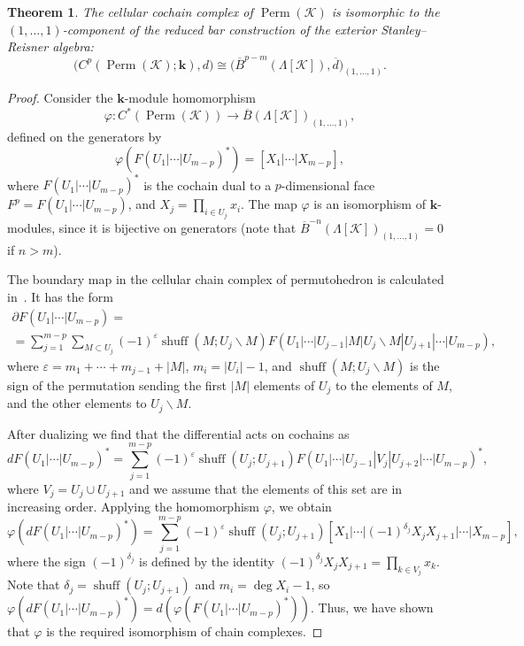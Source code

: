\documentclass[a4paper,12pt]{amsart}
\newcommand{\K}{\mathcal K}
\newcommand{\kk}{\mathbf{k}}
\newtheorem{theorem}[formula]{Theorem}
\theoremstyle{definition}
\theoremstyle{remark}
\numberwithin{equation}{section}
\DeclareMathOperator{\Perm}{Perm}
\begin{document}
\begin{theorem}\label{alg-cell}
The cellular cochain complex of $\Perm(\K)$ is isomorphic to the $(1 , \ldots, 1 )$-component of the reduced bar construction of the exterior Stanley--Reisner algebra:
\[
  \bigl(C^p(\Perm(\K); \kk), d\bigr) \cong \bigl(\overline{B}^{p-m}(\Lambda[\K]),\overline{d}\bigr)_{(1, \ldots, 1 )}.
\]  
\end{theorem}
\begin{proof}
Consider the $\kk$-module homomorphism 
\[
  \varphi\colon C^*(\Perm(\K)) \to 
  \overline{B}(\Lambda[\K])_{(1, \ldots, 1 )},
\]
defined on the generators by
\[
  \varphi (F(U_1 | \cdots | U_{m-p})^*) = [X_1 | \cdots | X_{m-p}],
\]  
where $F(U_1 | \cdots | U_{m-p})^*$ is the cochain dual to a $p$-dimensional face $F^p = F(U_1 | \cdots | U_{m-p})$, and $X_j = \prod_{i \in U_j} x_i$.
The map $\varphi$ is an isomorphism of $\kk$-modules, since it is bijective on generators (note that $\overline{B}^{-n}(\Lambda[\K])_{(1, \ldots, 1 )} = 0$ if $n > m$).

The boundary map in the cellular chain complex of permutohedron is calculated in~\cite{Mil}. It has the form
\begin{multline*}
  \partial F(U_1 | \cdots | U_{m-p}) = \\
  = \sum_{j = 1}^{m-p} \sum_{M \subset U_j} 
  (-1)^{\varepsilon} \mathop{\mathrm{shuff}} (M; U_j \backslash M) 
  F(U_1 | \cdots | U_{j-1} |  M | U_j \backslash M | U_{j+1} | \cdots | U_{m-p}),
\end{multline*}
where $\varepsilon = {m_1 + \cdots + m_{j-1} + |M|}$, $m_i = |U_i| - 1$, and $\mathop{\mathrm{shuff}}(M; U_j \backslash M)$ is the sign of the permutation sending the first $|M|$ elements of $U_j$ to the elements of $M$,
and the other elements to $U_j \backslash M$.

After dualizing we find that the differential acts on cochains as
\[
  d F(U_1 | \cdots | U_{m-p})^* = \sum_{j = 1}^{m-p} (-1)^\varepsilon \mathop{\mathrm{shuff}}(U_j; U_{j+1}) F(U_1 | \cdots | U_{j-1} | V_j | U_{j+2} | \cdots | U_{m-p})^*,
\]  
where $V_j = U_j \cup U_{j+1}$ and we assume that the elements of this set are in increasing order. 
Applying the homomorphism $\varphi$, we obtain
\[
  \varphi (dF(U_1 | \cdots | U_{m-p})^*) = \sum_{j = 1}^{m-p} (-1)^\varepsilon \mathop{\mathrm{shuff}}(U_j; U_{j+1}) [X_1 | \cdots | (-1)^{\delta_j} X_j X_{j+1} | \cdots | X_{m-p}],
\]
where the sign $(-1)^{\delta_j}$ is defined by the identity $(-1)^{\delta_j} X_j X_{j+1} = \prod_{k \in V_j} x_k$. 
Note that $\delta_j = \mathop{\mathrm{shuff}}(U_j; U_{j+1})$ and $m_i = \deg X_i - 1$, so $\varphi( dF(U_1 | \cdots | U_{m-p})^*) = d (\varphi(F(U_1 | \cdots | U_{m-p})^*))$.
Thus, we have shown that $\varphi$ is the required isomorphism of chain complexes.
\end{proof}
\end{document}
